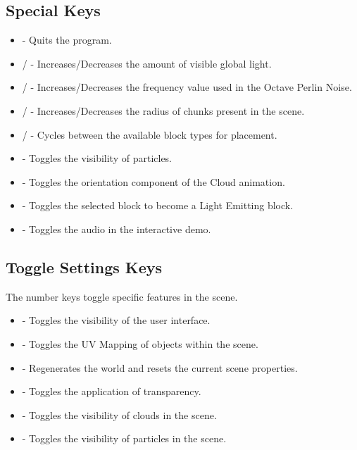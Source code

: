 \documentclass{book}
\begin{document}
\subsection{Special Keys}
\begin{itemize}
	\item {} - Quits the program. 
	\item {}/ - Increases/Decreases the amount of visible global light.
	\item {}/ - Increases/Decreases the frequency value used in the Octave Perlin Noise.
	\item {}/ - Increases/Decreases the radius of chunks present in the scene.
	\item {}/ - Cycles between the available block types for placement.
	\item {} - Toggles the visibility of particles.
	\item {} - Toggles the orientation component of the Cloud animation.
	\item {} - Toggles the selected block to become a Light Emitting block.
	\item {} - Toggles the audio in the interactive demo.
\end{itemize}
      
\subsection{Toggle Settings Keys}
The number keys toggle specific features in the scene.
      
\begin{itemize}
	\item {} - Toggles the visibility of the user interface.
	\item {} - Toggles the UV Mapping of objects within the scene.
	\item {} - Regenerates the world and resets the current scene properties.
	\item {} - Toggles the application of transparency.
	\item {} - Toggles the visibility of clouds in the scene.
	\item {} - Toggles the visibility of particles in the scene.
\end{itemize}

\end{document}
